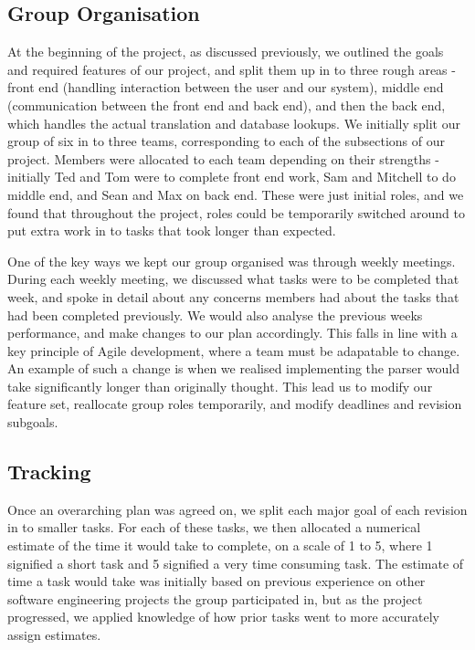 \documentclass[a4wide, 11pt]{article} \usepackage{a4, fullpage}
\begin{document}
\subsection{Group Organisation}

At the beginning of the project, as discussed previously, we outlined the goals
and required features of our project, and split them up in to three rough areas
- front end (handling interaction between the user and our system), middle end
(communication between the front end and back end), and then the back end,
which handles the actual translation and database lookups. We initially split
our group of six in to three teams, corresponding to each of the subsections of
our project. Members were allocated to each team depending on their strengths -
initially Ted and Tom were to complete front end work, Sam and Mitchell to do
middle end, and Sean and Max on back end. These were just initial roles, and we
found that throughout the project, roles could be temporarily switched around
to put extra work in to tasks that took longer than expected.

One of the key ways we kept our group organised was through weekly meetings.
During each weekly meeting, we discussed what tasks were to be completed that
week, and spoke in detail about any concerns members had about the tasks that
had been completed previously. We would also analyse the previous weeks
performance, and make changes to our plan accordingly. This falls in line with 
a key principle of Agile development, where a team must be adapatable to
change. An example of such a change is when we realised implementing the parser
would take significantly longer than originally thought. This lead us to modify 
our feature set, reallocate group roles temporarily, and modify deadlines 
and revision subgoals.


\subsection{Tracking}

Once an overarching plan was agreed on, we split each major goal of each
revision in to smaller tasks. For each of these tasks, we then allocated a
numerical estimate of the time it would take to complete, on a scale of 1 to 5,
where 1 signified a short task and 5 signified a very time consuming task. The
estimate of time a task would take was initially based on previous experience
on other software engineering projects the group participated in, but as the
project progressed, we applied knowledge of how prior tasks went to more
accurately assign estimates.
\end{document}
